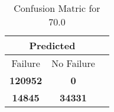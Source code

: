 \begin{table}[] 
\caption{Confusion Matric for 70.0} 
\label{Table: Prediction Accuracy-DMD70.0OnlySunEKF-combinationReflectionperfectNoFailurePrediction-Reflection} 
\centering 
\begin{tabular} 
 {@{}ccc@{}} 
\toprule 
\multicolumn{2}{c}{\textbf{Predicted}}
 \\ \midrule 
\multicolumn{1}{|c|}{Failure} & 
\multicolumn{1}{c|}{No Failure}
 \\ \midrule 
\multicolumn{1}{|c|}{\color{green}\textbf{120952}} & 
\multicolumn{1}{c|}{\color{red}\textbf{0}}
 \\ \midrule 
\multicolumn{1}{|c|}{\color{red}\textbf{14845}} & 
\multicolumn{1}{c|}{\color{green}\textbf{34331}}
 \\ \bottomrule 
\end{tabular} 
\end{table} 
